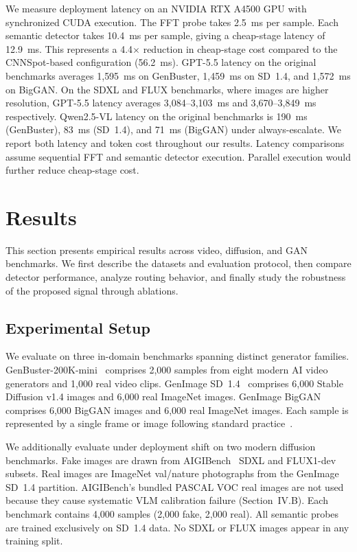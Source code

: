 \documentclass{ieeeaccess}
\begin{document}
We measure deployment latency on an NVIDIA RTX A4500 GPU with synchronized CUDA execution. The FFT probe takes 2.5~ms per sample. Each semantic detector takes 10.4~ms per sample,
giving a cheap-stage latency of 12.9~ms. This represents a 4.4$\times$ reduction in cheap-stage cost compared to the CNNSpot-based configuration (56.2~ms). GPT-5.5 latency on the original benchmarks averages 1{,}595~ms on GenBuster, 1{,}459~ms on SD~1.4, and 1{,}572~ms on BigGAN. On the SDXL and FLUX benchmarks, where images are higher resolution, GPT-5.5 latency averages 3{,}084--3{,}103~ms and 3{,}670--3{,}849~ms respectively. Qwen2.5-VL
latency on the original benchmarks is 190~ms (GenBuster), 83~ms (SD~1.4), and 71~ms
(BigGAN) under always-escalate. We report both latency and token cost throughout our results. Latency comparisons assume sequential FFT and semantic detector execution. Parallel
execution would further reduce cheap-stage cost.

\section{Results}

This section presents empirical results across video, diffusion, and GAN benchmarks. We first describe the datasets and evaluation protocol, then compare detector performance, analyze routing behavior, and finally study the robustness of the proposed signal through ablations.

\subsection{Experimental Setup}

We evaluate on three in-domain benchmarks spanning distinct generator families.
GenBuster-200K-mini~\cite{wen2025busterxmllmpoweredaigeneratedvideo} comprises 2{,}000
samples from eight modern AI video generators and 1{,}000 real video clips.
GenImage SD~1.4~\cite{NEURIPS2023_f4d4a021} comprises 6{,}000 Stable Diffusion v1.4
images and 6{,}000 real ImageNet images. GenImage
BigGAN~\cite{NEURIPS2023_f4d4a021} comprises 6{,}000 BigGAN images and 6{,}000 real
ImageNet images. Each sample is represented by a single frame or image following standard
practice~\cite{wen2025busterxmllmpoweredaigeneratedvideo}.

We additionally evaluate under deployment shift on two modern diffusion benchmarks.
Fake images are drawn from AIGIBench~\cite{li2025artificial} SDXL and FLUX1-dev
subsets. Real images are ImageNet val/nature photographs from the GenImage SD~1.4
partition. AIGIBench's bundled PASCAL VOC real images are not used because they
cause systematic VLM calibration failure (Section~IV.B). Each benchmark contains
4{,}000 samples (2{,}000 fake, 2{,}000 real). All semantic probes are trained
exclusively on SD~1.4 data. No SDXL or FLUX images appear in any training split.
\end{document}
